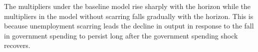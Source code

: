 The multipliers under the baseline model rise sharply with the horizon while the multipliers in the model without scarring falls gradually with the horizon. This is because unemployment scarring leads the decline in output in response to the fall in government spending to persist long after the government spending shock recovers.














